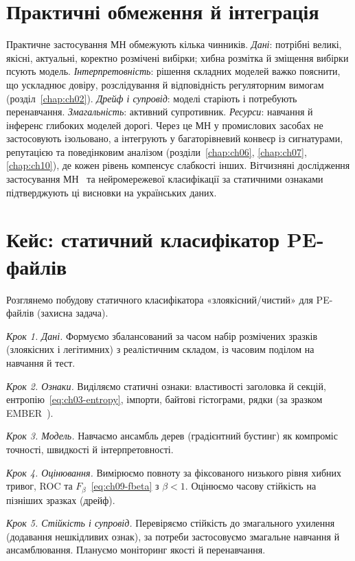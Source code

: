 \section{Практичні обмеження й інтеграція}\label{sec:ch09-limits}

Практичне застосування МН обмежують кілька чинників. \emph{Дані}: потрібні великі, якісні, актуальні, коректно розмічені вибірки; хибна розмітка й зміщення вибірки псують модель. \emph{Інтерпретовність}: рішення складних моделей важко пояснити, що ускладнює довіру, розслідування й відповідність регуляторним вимогам (розділ~\ref{chap:ch02}). \emph{Дрейф і супровід}: моделі старіють і потребують перенавчання. \emph{Змагальність}: активний супротивник. \emph{Ресурси}: навчання й інференс глибоких моделей дорогі. Через це МН у промислових засобах не застосовують ізольовано, а інтегрують у багаторівневий конвеєр із сигнатурами, репутацією та поведінковим аналізом (розділи~\ref{chap:ch06}, \ref{chap:ch07}, \ref{chap:ch10}), де кожен рівень компенсує слабкості інших. Вітчизняні дослідження застосування МН~\cite{ch09:ml-ua} та нейромережевої класифікації за статичними ознаками~\cite{ch09:neural-ua} підтверджують ці висновки на українських даних.

\section{Кейс: статичний класифікатор PE-файлів}\label{sec:ch09-case}

Розглянемо побудову статичного класифікатора «злоякісний/чистий» для PE-файлів (захисна задача).

\emph{Крок 1. Дані.} Формуємо збалансований за часом набір розмічених зразків (злоякісних і легітимних) з реалістичним складом, із часовим поділом на навчання й тест.

\emph{Крок 2. Ознаки.} Виділяємо статичні ознаки: властивості заголовка й секцій, ентропію~\eqref{eq:ch03-entropy}, імпорти, байтові гістограми, рядки (за зразком EMBER~\cite{ch09:ember}).

\emph{Крок 3. Модель.} Навчаємо ансамбль дерев (градієнтний бустинг) як компроміс точності, швидкості й інтерпретовності.

\emph{Крок 4. Оцінювання.} Вимірюємо повноту за фіксованого низького рівня хибних тривог, ROC та $F_\beta$~\eqref{eq:ch09-fbeta} з $\beta<1$. Оцінюємо часову стійкість на пізніших зразках (дрейф).

\emph{Крок 5. Стійкість і супровід.} Перевіряємо стійкість до змагального ухилення (додавання нешкідливих ознак), за потреби застосовуємо змагальне навчання й ансамблювання. Плануємо моніторинг якості й перенавчання.

